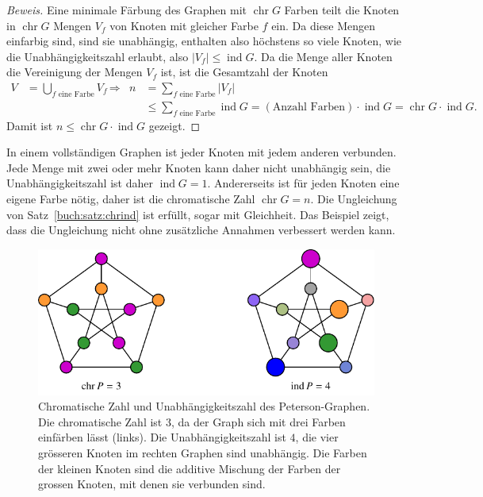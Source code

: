 \begin{proof}[Beweis]
Eine minimale Färbung des Graphen mit $\operatorname{chr}G$ Farben
teilt die Knoten in $\operatorname{chr}G$ Mengen $V_f$ von Knoten mit
gleicher Farbe $f$ ein.
Da diese Mengen einfarbig sind, sind sie unabhängig, enthalten also
höchstens so viele Knoten, wie die Unabhängigkeitszahl erlaubt,
also $|V_f|\le \operatorname{ind}G$.
Da die Menge aller Knoten die Vereinigung der Mengen $V_f$ ist,
ist die Gesamtzahl der Knoten 
\begin{align*}
V
&=
\bigcup_{\text{$f$ eine Farbe}} V_f
&&\Rightarrow&
n
&=
\sum_{\text{$f$ eine Farbe}} |V_f| 
\\
&
&&&
&\le
\sum_{\text{$f$ eine Farbe}} \operatorname{ind}G
=
(\text{Anzahl Farben})\cdot \operatorname{ind}G
=
\operatorname{chr}G \cdot \operatorname{ind}G.
\end{align*}
Damit ist $n\le \operatorname{chr}G\cdot\operatorname{ind}G$ gezeigt.
\qedhere
\end{proof}

\begin{beispiel}
In einem vollständigen Graphen ist jeder Knoten mit jedem anderen verbunden.
Jede Menge mit zwei oder mehr Knoten kann daher nicht unabhängig sein, die
Unabhängigkeitszahl ist daher $\operatorname{ind}G=1$.
Andererseits ist für jeden Knoten eine eigene Farbe nötig, daher ist die
chromatische Zahl $\operatorname{chr}G=n$.
Die Ungleichung von Satz~\ref{buch:satz:chrind} ist erfüllt, sogar mit
Gleichheit.
Das Beispiel zeigt, dass die Ungleichung nicht ohne zusätzliche Annahmen
verbessert werden kann.
\end{beispiel}

\begin{figure}
\centering
\includegraphics{chapters/70-graphen/images/petersonchrind.pdf}
\caption{Chromatische Zahl und Unabhängigkeitszahl des Peterson-Graphen.
Die chromatische Zahl ist $3$, da der Graph sich mit drei Farben einfärben
lässt (links).
Die Unabhängigkeitszahl ist $4$, die vier grösseren Knoten im rechten
Graphen sind unabhängig.
Die Farben der kleinen Knoten sind die additive Mischung der Farben
der grossen Knoten, mit denen sie verbunden sind.
\label{buch:graphen:fig:chrindpeterson}}
\end{figure}

